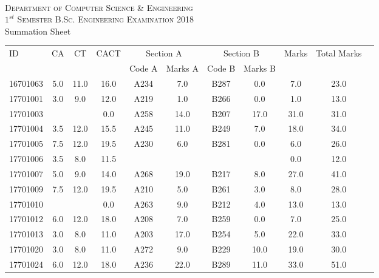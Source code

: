 \documentclass[12pt]{article}
\begin{document}
    \centering
    \begin{minipage}[m]{.8\textwidth} \centering 
	\smallskip
	\\
	\textsc{Department of Computer Science \& Engineering}\\
	\textsc{$1^{st}$ Semester B.Sc. Engineering Examination 2018}\\
	{\large {\sc Summation Sheet}}\\  
    \end{minipage} 
    \begin{center} 
	\renewcommand{\arraystretch}{1.08}
	\begin{small}
    \begin{tabular}{|l|c|c|c|c|c|c|c|c|c|c|} \hline
	\multirow{2}{*}{ID} & 	\multirow{2}{*}{CA}  & 	\multirow{2}{*}{CT}  & 	\multirow{2}{*}{CACT}  & \multicolumn{2 }{|c|}{Section A}& \multicolumn{2 }{c|}{Section B} & 	\multirow{2}{*}{Marks}  & 	\multirow{2}{*}{Total Marks}  \\ 
	&  &  &  & Code A & Marks A & Code B & Marks B&  &  \\ \hline
16701063 & 5.0 & 11.0 & 16.0 & A234 & 7.0 & B287 & 0.0 & 7.0 & 23.0\\ \hline 
17701001 & 3.0 & 9.0 & 12.0 & A219 & 1.0 & B266 & 0.0 & 1.0 & 13.0\\ \hline 
17701003 &  &  & 0.0 & A258 & 14.0 & B207 & 17.0 & 31.0 & 31.0\\ \hline 
17701004 & 3.5 & 12.0 & 15.5 & A245 & 11.0 & B249 & 7.0 & 18.0 & 34.0\\ \hline 
17701005 & 7.5 & 12.0 & 19.5 & A230 & 6.0 & B281 & 0.0 & 6.0 & 26.0\\ \hline 
17701006 & 3.5 & 8.0 & 11.5 &  &  &  &  & 0.0 & 12.0\\ \hline 
17701007 & 5.0 & 9.0 & 14.0 & A268 & 19.0 & B217 & 8.0 & 27.0 & 41.0\\ \hline 
17701009 & 7.5 & 12.0 & 19.5 & A210 & 5.0 & B261 & 3.0 & 8.0 & 28.0\\ \hline 
17701010 &  &  & 0.0 & A263 & 9.0 & B212 & 4.0 & 13.0 & 13.0\\ \hline 
17701012 & 6.0 & 12.0 & 18.0 & A208 & 7.0 & B259 & 0.0 & 7.0 & 25.0\\ \hline 
17701013 & 3.0 & 8.0 & 11.0 & A203 & 17.0 & B254 & 5.0 & 22.0 & 33.0\\ \hline 
17701020 & 3.0 & 8.0 & 11.0 & A272 & 9.0 & B229 & 10.0 & 19.0 & 30.0\\ \hline 
17701024 & 6.0 & 12.0 & 18.0 & A236 & 22.0 & B289 & 11.0 & 33.0 & 51.0\\ \hline 

\end{tabular}
\end{small}
\end{center}
\end{document}
